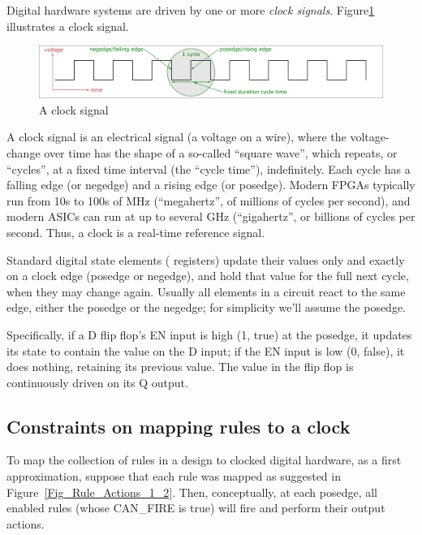 Digital hardware systems are driven by one or more \emph{clock
signals}. Figure\ref{Fig_Clock} illustrates a clock signal.
\begin{figure}[htbp]
  \centerline{\includegraphics[width=6in,angle=0]{Figures/Fig_Clock}}
  \caption{\label{Fig_Clock} A clock signal}
\end{figure}
A clock signal is an electrical signal (a voltage on a wire), where
the voltage-change over time has the shape of a so-called ``square
wave'', which repeats, or ``cycles'', at a fixed time interval (the
``cycle time''), indefinitely.  Each cycle has a falling edge (or
negedge) and a rising edge (or posedge).  Modern FPGAs typically run
from 10s to 100s of MHz (``megahertz'', of millions of cycles per
second), and modern ASICs can run at up to several GHz (``gigahertz'',
or billions of cycles per second.  Thus, a clock is a real-time
reference signal.

Standard digital state elements ({\eg} registers) update their values
only and exactly on a clock edge (posedge or negedge), and hold that
value for the full next cycle, when they may change again.  Usually
all elements in a circuit react to the same edge, either the posedge
or the negedge; for simplicity we'll assume the posedge.

Specifically, if a D flip flop's EN input is high (1, true) at the
posedge, it updates its state to contain the value on the D input; if
the EN input is low (0, false), it does nothing, retaining its
previous value.  The value in the flip flop is continuously driven on
its Q output.


\subsection{Constraints on mapping rules to a clock}

\label{Sec_Constraints_on_Mapping_Rules_to_a_Clock}

To map the collection of rules in a {\BSV} design to clocked digital
hardware, as a first approximation, suppose that each rule was mapped
as suggested in Figure~\ref{Fig_Rule_Actions_1_2}.  Then,
conceptually, at each posedge, all enabled rules (whose CAN\_FIRE is
true) will fire and perform their output actions.

